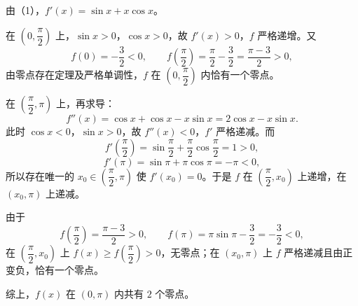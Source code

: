 \begin{answer}
由（1），$f'(x)=\sin x+x\cos x$。

在 $\left(0,\dfrac\pi2\right)$ 上，$\sin x>0$，$\cos x>0$，故 $f'(x)>0$，$f$ 严格递增。又
\nopagebreak[4]
\[f(0)=-\frac32<0,\qquad
f\left(\frac\pi2\right)=\frac\pi2-\frac32=\frac{\pi-3}{2}>0,\]
由零点存在定理及严格单调性，$f$ 在 $\left(0,\dfrac\pi2\right)$ 内恰有一个零点。

在 $\left(\dfrac\pi2,\pi\right)$ 上，再求导：
\nopagebreak[4]
\[f''(x)=\cos x+\cos x-x\sin x=2\cos x-x\sin x.\]
此时 $\cos x<0$，$\sin x>0$，故 $f''(x)<0$，$f'$ 严格递减。而
\nopagebreak[4]
\[f'\left(\frac\pi2\right)=\sin\frac\pi2+\frac\pi2\cos\frac\pi2=1>0,\]
\nopagebreak[4]
\[f'(\pi)=\sin\pi+\pi\cos\pi=-\pi<0,\]
所以存在唯一的 $x_0\in\left(\dfrac\pi2,\pi\right)$ 使 $f'(x_0)=0$。于是 $f$ 在 $\left(\dfrac\pi2,x_0\right)$ 上递增，在 $(x_0,\pi)$ 上递减。

由于
\nopagebreak[4]
\[f\left(\frac\pi2\right)=\frac{\pi-3}{2}>0,\qquad f(\pi)=\pi\sin\pi-\frac32=-\frac32<0,\]
在 $\left(\dfrac\pi2,x_0\right)$ 上 $f(x)\geqslant f\left(\dfrac\pi2\right)>0$，无零点；在 $(x_0,\pi)$ 上 $f$ 严格递减且由正变负，恰有一个零点。

综上，$f(x)$ 在 $(0,\pi)$ 内共有 $2$ 个零点。



\end{answer}